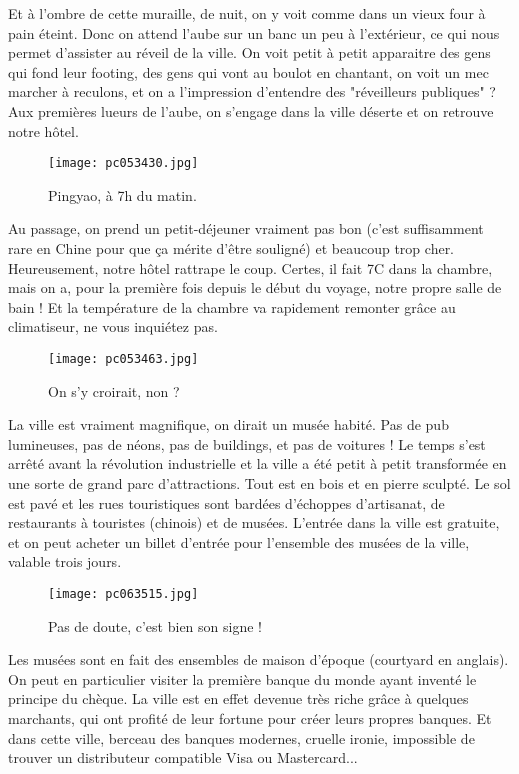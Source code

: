 \documentclass{book}
\begin{document}
Et à l'ombre de cette muraille, de nuit, on y voit comme dans un vieux four à pain éteint. Donc on attend l'aube sur un banc un peu à l'extérieur, ce qui nous permet d'assister au réveil de la ville. On voit petit à petit apparaitre des gens qui fond leur footing, des gens qui vont au boulot en chantant, on voit un mec marcher à reculons, et on a l'impression d'entendre des "réveilleurs publiques" ? Aux premières lueurs de l'aube, on s'engage dans la ville déserte et on retrouve notre hôtel.


\begin{figure}[h]
\centering
\texttt{[image: pc053430.jpg]}
\caption*{Pingyao, à 7h du matin.}
\end{figure}

Au passage, on prend un petit-déjeuner vraiment pas bon (c'est suffisamment rare en Chine pour que ça mérite d'être souligné) et beaucoup trop cher. Heureusement, notre hôtel rattrape le coup. Certes, il fait 7\textdegree C dans la chambre, mais on a, pour la première fois depuis le début du voyage, notre propre salle de bain ! Et la température de la chambre va rapidement remonter grâce au climatiseur, ne vous inquiétez pas.


\begin{figure}[h]
\centering
\texttt{[image: pc053463.jpg]}
\caption*{On s'y croirait, non ?}
\end{figure}

La ville est vraiment magnifique, on dirait un musée habité. Pas de pub lumineuses, pas de néons, pas de buildings, et pas de voitures ! Le temps s'est arrêté avant la révolution industrielle et la ville a été petit à petit transformée en une sorte de grand parc d'attractions. Tout est en bois et en pierre sculpté. Le sol est pavé et les rues touristiques sont bardées d'échoppes d'artisanat, de restaurants à touristes (chinois) et de musées. L'entrée dans la ville est gratuite, et on peut acheter un billet d'entrée pour l'ensemble des musées de la ville, valable trois jours.


\begin{figure}[h]
\centering
\texttt{[image: pc063515.jpg]}
\caption*{Pas de doute, c'est bien son signe !}
\end{figure}

Les musées sont en fait des ensembles de maison d'époque (courtyard en anglais). On peut en particulier visiter la première banque du monde ayant inventé le principe du chèque. La ville est en effet devenue très riche grâce à quelques marchants, qui ont profité de leur fortune pour créer leurs propres banques. Et dans cette ville, berceau des banques modernes, cruelle ironie, impossible de trouver un distributeur compatible Visa ou Mastercard...
\end{document}
